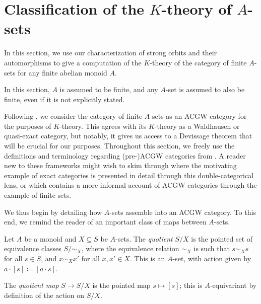\documentclass[11pt]{amsart}
\begin{document}
\section{Classification of the \texorpdfstring{$K$}{K}-theory of \texorpdfstring{$A$}{A}-sets}

In this section, we use our characterization of strong orbits and their automorphisms to give a computation of the $K$-theory of the category of finite $A$-sets for any finite abelian monoid $A$. 

\begin{notation}
    In this section, $A$ is assumed to be finite, and any $A$-set is assumed to also be finite, even if it is not explicitly stated. 
\end{notation}

Following \cite{Hchuck}, we consider the category of finite $A$-sets as an ACGW category for the purposes of $K$-theory. This agrees with its $K$-theory as a Waldhausen or quasi-exact category, but notably, it gives us access to a Devissage theorem that will be crucial for our purposes. Throughout this section, we freely use the definitions and terminology regarding (pre-)ACGW categories from \cite{CZ-cgw}. A reader new to these frameworks might wish to skim through \cite[Section 3.1]{SS-cgw} where the motivating example of exact categories is presented in detail through this double-categorical lens, or \cite{ACGWhomology} which contains a more informal account of ACGW categories through the example of finite sets.


We thus begin by detailing how $A$-sets assemble into an ACGW category. To this end, we remind the reader of an important class of maps between $A$-sets.

\begin{definition}\label{defn.quotient}
    Let $A$ be a monoid and $X\subseteq S$ be $A$-sets. The \emph{quotient} $S/X$ is the pointed set of equivalence classes $S/\sim_X$, where the equivalence relation $\sim_X$ is such that $s\sim_X s$ for all $s\in S$, and $x\sim_X x'$ for all $x,x'\in X$. This is an $A$-set, with action given by $a\cdot [s]\coloneqq [a\cdot s]$. 

    The \emph{quotient map} $S\to S/X$ is the pointed map $s\mapsto [s]$; this is $A$-equivariant by definition of the action on $S/X$. 
\end{definition}
\end{document}
